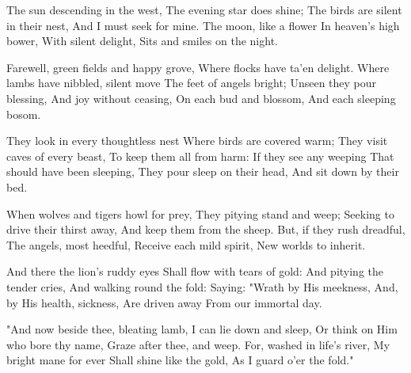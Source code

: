 
\begin{poem}

\begin{stanza}
\verseindent The sun descending in the west,\verseline
The evening star does shine;\verseline
The birds are silent in their nest,\verseline
And I must seek for mine.\verseline
\verseindent The moon, like a flower\verseline
\verseindent In heaven's high bower,\verseline
\verseindent With silent delight,\verseline
\verseindent Sits and smiles on the night.
\end{stanza}
\begin{stanza}
\verseindent Farewell, green fields and happy grove,\verseline
Where flocks have ta'en delight.\verseline
Where lambs have nibbled, silent move\verseline
The feet of angels bright;\verseline
\verseindent Unseen they pour blessing,\verseline
\verseindent And joy without ceasing,\verseline
\verseindent On each bud and blossom,\verseline
\verseindent And each sleeping bosom.
\end{stanza}
\begin{stanza}
\verseindent They look in every thoughtless nest\verseline
Where birds are covered warm;\verseline
They visit caves of every beast,\verseline
To keep them all from harm:\verseline
\verseindent If they see any weeping\verseline
\verseindent That should have been sleeping,\verseline
\verseindent They pour sleep on their head,\verseline
\verseindent And sit down by their bed.
\end{stanza}
\begin{stanza}
\verseindent When wolves and tigers howl for prey,\verseline
They pitying stand and weep;\verseline
Seeking to drive their thirst away,\verseline
And keep them from the sheep.\verseline
\verseindent But, if they rush dreadful,\verseline
\verseindent The angels, most heedful,\verseline
\verseindent Receive each mild spirit,\verseline
\verseindent New worlds to inherit.
\end{stanza}
\begin{stanza}
\verseindent And there the lion's ruddy eyes\verseline
Shall flow with tears of gold:\verseline
And pitying the tender cries,\verseline
And walking round the fold:\verseline
\verseindent Saying: "Wrath by His meekness,\verseline
\verseindent And, by His health, sickness,\verseline
\verseindent Are driven away\verseline
\verseindent From our immortal day.
\end{stanza}
\begin{stanza}
\verseindent "And now beside thee, bleating lamb,\verseline
I can lie down and sleep,\verseline
Or think on Him who bore thy name,\verseline
Graze after thee, and weep.\verseline
\verseindent For, washed in life's river,\verseline
\verseindent My bright mane for ever\verseline
\verseindent Shall shine like the gold,\verseline
\verseindent As I guard o'er the fold."
\end{stanza}

\end{poem}